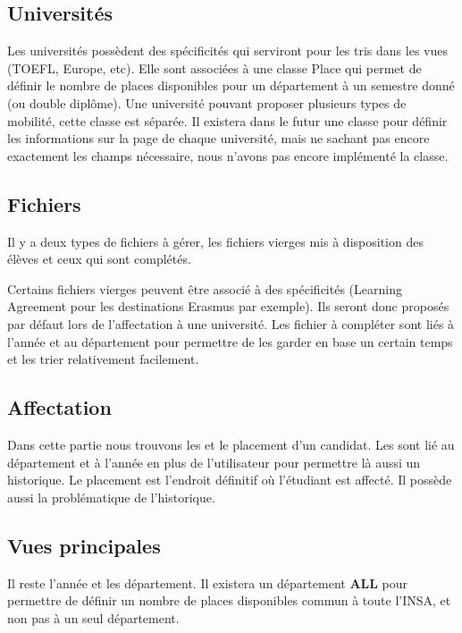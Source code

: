 \subsection{Universités}

Les universités possèdent des spécificités qui serviront pour les tris dans les vues (TOEFL, Europe, etc).
Elle sont associées à une classe Place qui permet de définir le nombre de places disponibles pour un département à un semestre donné (ou double diplôme). Une université pouvant proposer plusieurs types de mobilité, cette classe est séparée.
Il existera dans le futur une classe pour définir les informations sur la page de chaque université, mais ne sachant pas encore exactement les champs nécessaire, nous n'avons pas encore implémenté la classe.

\subsection{Fichiers}

Il y a deux types de fichiers à gérer, les fichiers vierges mis à disposition des élèves et ceux qui sont complétés.

Certains fichiers vierges peuvent être associé à des spécificités (Learning Agreement pour les destinations Erasmus par exemple). Ils seront donc proposés par défaut lors de l'affectation à une université.
Les fichier à compléter sont liés à l'année et au département pour permettre de les garder en base un certain temps et les trier relativement facilement.

\subsection{Affectation}

Dans cette partie nous trouvons les \voe et le placement d'un candidat. Les \voe sont lié au département et à l'année en plus de l'utilisateur pour permettre là aussi un historique.
Le placement est l'endroit définitif où l'étudiant est affecté. Il possède aussi la problématique de l'historique.

\subsection{Vues principales}

Il reste l'année et les département. 
Il existera un département \textbf{ALL} pour permettre de définir un nombre de places disponibles commun à toute l'INSA, et non pas à un seul département.

